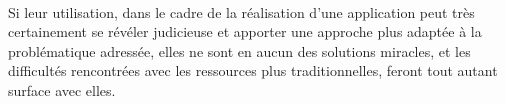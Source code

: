 {  \paragraph{} Si leur utilisation, dans le cadre de la réalisation d'une application peut très
  certainement se révéler judicieuse et apporter une approche plus adaptée à la problématique
  adressée, elles ne sont en aucun des solutions miracles, et les difficultés rencontrées avec les
  ressources plus traditionnelles, feront tout autant surface avec elles.
}

